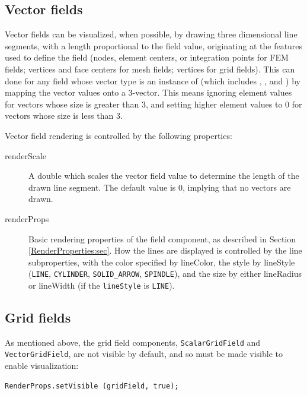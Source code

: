 \subsection{Vector fields}

Vector fields can be visualized, when possible, by drawing three
dimensional line segments, with a length proportional to the field
value, originating at the features used to define the field (nodes,
element centers, or integration points for FEM fields; vertices and
face centers for mesh fields; vertices for grid fields).  This can
done for any field whose vector type is an instance of
 (which includes
,
, and
) by mapping the vector values
onto a 3-vector. This means ignoring element values for vectors whose
size is greater than 3, and setting higher element values to 0 for
vectors whose size is less than 3.

Vector field rendering is controlled by the following properties:

\begin{description}

\item[renderScale]\mbox{}

A double which scales the vector field value to determine the length
of the drawn line segment. The default value is 0, implying that no
vectors are drawn.

\item[renderProps]\mbox{}

Basic rendering properties of the field component, as described in
Section \ref{RenderProperties:sec}. How the lines are displayed is
controlled by the line subproperties, with the color specified by {\sf
lineColor}, the style by {\sf lineStyle} ({\tt LINE}, {\tt CYLINDER},
{\tt SOLID\_ARROW}, {\tt SPINDLE}), and the size by either {\sf
lineRadius} or {\sf lineWidth} (if the {\tt lineStyle} is {\tt LINE}).

\end{description}

\subsection{Grid fields}
\label{gridFields:sec}

As mentioned above, the grid field components, {\tt ScalarGridField}
and {\tt VectorGridField}, are not visible by default, and so must be
made visible to enable visualization:
%
\begin{lstlisting}[]
  RenderProps.setVisible (gridField, true);
\end{lstlisting}
%

